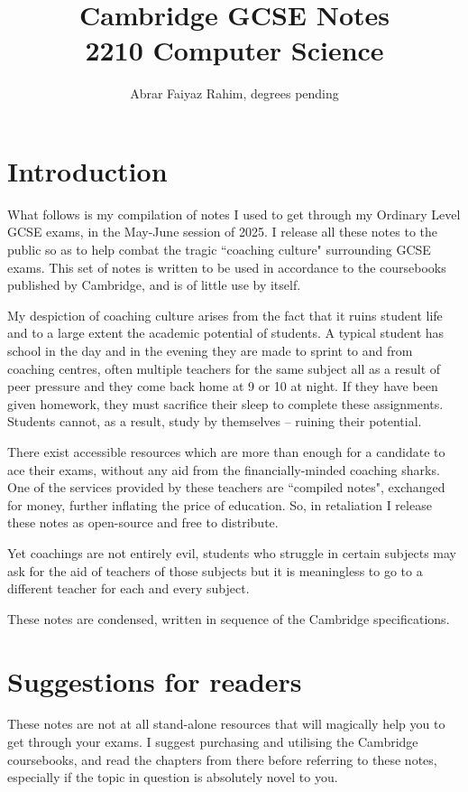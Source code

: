 \documentclass{article}
\title {Cambridge GCSE Notes \\ 2210 Computer Science }
\author {Abrar Faiyaz Rahim, degrees pending}
\date {}
\begin{document}
\maketitle \newpage
\section*{Introduction}
What follows is my compilation of notes I used to get through my Ordinary Level GCSE 
exams, in the May-June session of 2025. I release all these notes to the public so as to 
help combat the tragic ``coaching culture" surrounding GCSE exams. This set of notes is 
written to be used in accordance to the coursebooks published by Cambridge, and is of
little use by itself.

My despiction of coaching culture arises from the fact that it ruins student life and
to a large extent the academic potential of students. A typical student has school in the 
day and in the evening they are made to sprint to and from coaching centres, often 
multiple teachers for the same subject all as a result of peer pressure and they come back home at 
9 or 10 at night. If they have been given homework, they must sacrifice their sleep to
complete these assignments. Students cannot, as a result, study by themselves -- ruining
their potential.

There exist accessible resources which are more than enough for a candidate to ace their 
exams, without any aid from the financially-minded coaching sharks. One of the services
provided by these teachers are ``compiled notes", exchanged for money, 
further inflating the price of education. So, in retaliation I release these 
notes as open-source and free to distribute.

Yet coachings are not entirely evil, students who struggle in certain subjects may ask 
for the aid of teachers of those subjects but it is meaningless to go to a different 
teacher for each and every subject.

These notes are condensed, written in sequence of the Cambridge specifications.

\section*{Suggestions for readers}
These notes are not at all stand-alone resources that will magically help you to get 
through your exams. I suggest purchasing and utilising the Cambridge coursebooks, and
read the chapters from there before referring to these notes, especially if the topic
in question is absolutely novel to you. 
\end{document}
